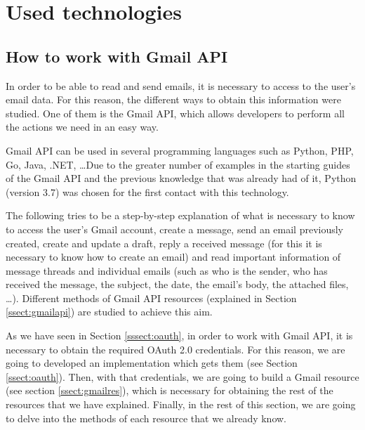 \chapter{Used technologies}
\label{cap:usedtech}


\section{How to work with Gmail API}\label{sect:gmailapitech}
In order to be able to read and send emails, it is necessary to access to the user's email data. For this reason, the different ways to obtain this information were studied. One of them is the Gmail API, which allows developers to perform all the actions we need in an easy way.

Gmail API can be used in several programming languages such as Python, PHP, Go, Java, .NET, \ldots\phantom{ }Due to the greater number of examples in the starting guides of the Gmail API \citep{gmailAPI} and the previous knowledge that was already had of it, Python (version 3.7) was chosen for the first contact with this technology.

The following tries to be a step-by-step explanation of what is necessary to know to access the user's Gmail account, create a message, send an email previously created, create and update a draft, reply a received message (for this it is necessary to know how to create an email) and read important information of message threads and individual emails (such as who is the sender, who has received the message, the subject, the date, the email's body, the attached files, \ldots). Different methods of Gmail API resources (explained in Section \ref{ssect:gmailapi}) are studied to achieve this aim.

As we have seen in Section \ref{sssect:oauth}, in order to work with Gmail API, it is necessary to obtain the required OAuth 2.0 credentials. For this reason, we are going to developed an implementation which gets them (see Section \ref{ssect:oauth}). Then, with that credentials, we are going to build a Gmail resource (see section \ref{ssect:gmailres}), which is necessary for obtaining the rest of the resources that we have explained. Finally, in the rest of this section, we are going to delve into the methods of each resource that we already know.

